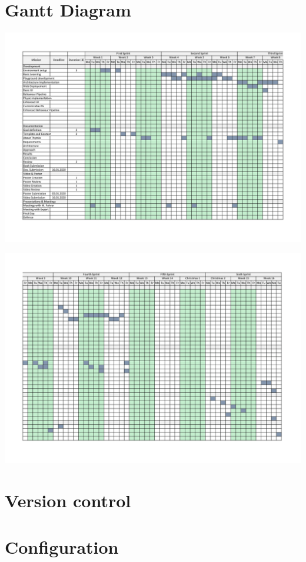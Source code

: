 \documentclass{scrbook}
\begin{document}
\chapter{Gantt Diagram}
\clearpage
\begin{center}
  \includegraphics[scale = 0.28, angle=-90]{./Gantt-1}
\end{center}
\begin{center}
  \includegraphics[scale = 0.28,  angle=-90]{./Gantt-2}
\end{center}
\clearpage

\chapter{Version control}

\chapter{Configuration}
\end{document}
